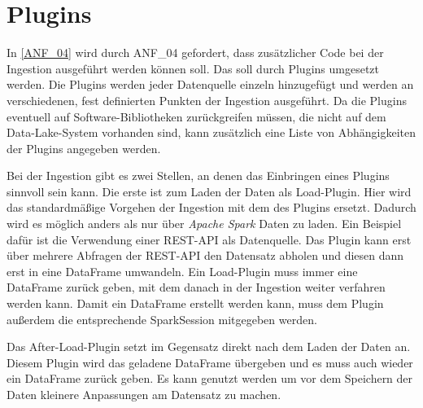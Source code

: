 \section{Plugins}

In \ref{ANF_04} wird durch ANF\_04 gefordert, dass zusätzlicher Code bei der Ingestion ausgeführt werden können soll.
Das soll durch Plugins umgesetzt werden.
Die Plugins werden jeder Datenquelle einzeln hinzugefügt und werden an verschiedenen, fest definierten Punkten der Ingestion ausgeführt. 
Da die Plugins eventuell auf Software-Bibliotheken zurückgreifen müssen, die nicht auf dem Data-Lake-System vorhanden sind, kann zusätzlich eine Liste von Abhängigkeiten der Plugins angegeben werden.

Bei der Ingestion gibt es zwei Stellen, an denen das Einbringen eines Plugins sinnvoll sein kann.
Die erste ist zum Laden der Daten als Load-Plugin.
Hier wird das standardmäßige Vorgehen der Ingestion mit dem des Plugins ersetzt.
Dadurch wird es möglich anders als nur über \textit{Apache Spark} Daten zu laden.
Ein Beispiel dafür ist die Verwendung einer REST-API als Datenquelle.
Das Plugin kann erst über mehrere Abfragen der REST-API den Datensatz abholen und diesen dann erst in eine DataFrame umwandeln.
Ein Load-Plugin muss immer eine DataFrame zurück geben, mit dem danach in der Ingestion weiter verfahren werden kann.
Damit ein DataFrame erstellt werden kann,  muss dem Plugin außerdem die entsprechende SparkSession mitgegeben werden.

Das After-Load-Plugin setzt im Gegensatz direkt nach dem Laden der Daten an.
Diesem Plugin wird das geladene DataFrame übergeben und es muss auch wieder ein DataFrame zurück geben.
Es kann genutzt werden um vor dem Speichern der Daten kleinere Anpassungen am Datensatz zu machen.